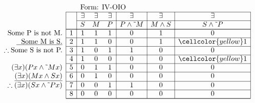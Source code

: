 \documentclass[10pt,legalpaper,landscape,cmtt]{article}
\begin{document}
{\begin{minipage}[t]{3.25in}
	\(
	\begin{array}{r|c|ccc|c|c|c|}
		\multicolumn{2}{c}{}&\multicolumn{6}{l}{\mbox{Form: IV-OIO}} \\ \cline{2-8}
		\hspace{1in}	&	& \exists & \exists & \exists & \exists & \exists & \exists\\ \cline{3-8}
		&	& S & M & P &  P \wedge \tilde~M  &  M \wedge S  &  S \wedge \tilde~P \\ \cline{2-8} \cline{2-8}
		\phantom{\therefore}\mbox{Some P is not M.}   & 1 & 1 & 1 & 1 &   0   &   1   &   0  \\ \cline{2-8}
		\underline{\phantom{\therefore}\mbox{Some M is S.}}   & 2 & 1 & 1 & 0 &   0   &   1   &   \cellcolor{yellow} 1  \\ \cline{2-8}
		\therefore \mbox{Some S is not P.}   & 3 & 1 & 0 & 1 &   1   &   0   &   0  \\ \cline{2-8}
		& 4 & 1 & 0 & 0 &   0   &   0   &   \cellcolor{yellow} 1  \\ \cline{2-8}
		(\exists x)(Px \wedge \tilde~Mx)   & 5 & 0 & 1 & 1 &   0   &   0   &   0  \\ \cline{2-8}
		\underline{(\exists x)(Mx \wedge Sx)}   & 6 & 0 & 1 & 0 &   0   &   0   &   0  \\ \cline{2-8}
		\therefore(\exists x)(Sx \wedge \tilde~Px)   & 7 & 0 & 0 & 1 &   1   &   0   &   0  \\ \cline{2-8}
		& 8 & 0 & 0 & 0 &   0   &   0   &   0   \\ \cline{2-8}\cline{2-8} 
	\end{array}
	\)
\end{minipage}

\newpage %

}
\end{document}
